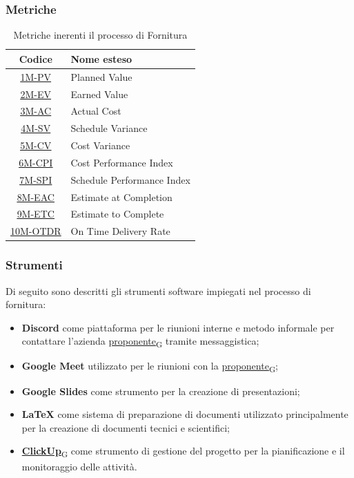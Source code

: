 \subsubsection{Metriche}
\begin{table}[!h]
	\centering
	\begin{tabular}{ | c | l | }
		\hline
		\textbf{Codice}                       & \textbf{Nome esteso}       \\
		\hline
		\underline{\hyperlink{1M}{1M-PV}}     & Planned Value              \\
		\underline{\hyperlink{2M}{2M-EV}}     & Earned Value               \\
		\underline{\hyperlink{3M}{3M-AC}}     & Actual Cost                \\
		\underline{\hyperlink{4M}{4M-SV}}     & Schedule Variance          \\
		\underline{\hyperlink{5M}{5M-CV}}     & Cost Variance              \\
		\underline{\hyperlink{6M}{6M-CPI}}    & Cost Performance Index     \\
		\underline{\hyperlink{7M}{7M-SPI}}    & Schedule Performance Index \\
		\underline{\hyperlink{8M}{8M-EAC}}    & Estimate at Completion     \\
		\underline{\hyperlink{9M}{9M-ETC}}    & Estimate to Complete       \\
		\underline{\hyperlink{10M}{10M-OTDR}} & On Time Delivery Rate      \\
		\hline
	\end{tabular}
	\caption{Metriche inerenti il processo di Fornitura}
\end{table}

\subsubsection{Strumenti}
Di seguito sono descritti gli strumenti software impiegati nel processo di fornitura:
\begin{itemize}
	\item \textbf{Discord} come piattaforma per le riunioni interne e metodo informale per contattare l'azienda \href{https://7last.github.io/docs/rtb/documentazione-interna/glossario\#proponente}{proponente\textsubscript{G}} tramite messaggistica;
	\item \textbf{Google Meet} utilizzato per le riunioni con la \href{https://7last.github.io/docs/rtb/documentazione-interna/glossario\#proponente}{proponente\textsubscript{G}};
	\item \textbf{Google Slides} come strumento per la creazione di presentazioni;
	\item \textbf{LaTeX} come sistema di preparazione di documenti utilizzato principalmente per la creazione di documenti tecnici e scientifici;
	\item \href{https://7last.github.io/docs/rtb/documentazione-interna/glossario\#clickup}{\textbf{ClickUp}\textsubscript{G}} come strumento di gestione del progetto per la pianificazione e il monitoraggio delle attività.
\end{itemize}

